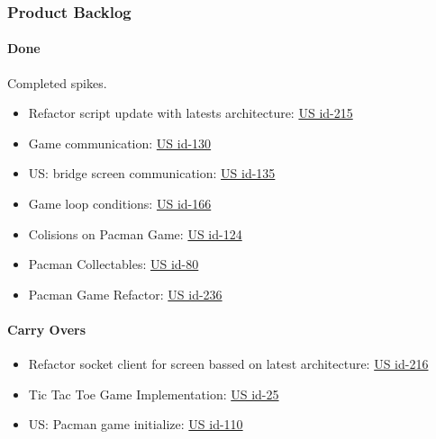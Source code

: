 \newpage

\subsubsection{Product Backlog}

\paragraph{Done}
Completed spikes.

\begin{itemize}
    \item Refactor script update with latests architecture: \href{https://tree.taiga.io/project/joseluis-teran-coffeetime/us/215?milestone=396824}{US id-215}
    \item Game communication: \href{https://tree.taiga.io/project/joseluis-teran-coffeetime/us/130?milestone=396824}{US id-130}
    \item US: bridge screen communication: \href{https://tree.taiga.io/project/joseluis-teran-coffeetime/us/135?milestone=396824}{US id-135}
    \item Game loop conditions: \href{https://tree.taiga.io/project/joseluis-teran-coffeetime/us/166?milestone=396824}{US id-166}
    \item  Colisions on Pacman Game: \href{https://tree.taiga.io/project/joseluis-teran-coffeetime/us/124?milestone=396824}{US id-124}
    \item  Pacman Collectables: \href{https://tree.taiga.io/project/joseluis-teran-coffeetime/us/80?milestone=396824}{US id-80}
    \item  Pacman Game Refactor: \href{https://tree.taiga.io/project/joseluis-teran-coffeetime/us/236?milestone=396824}{US id-236}
\end{itemize}

\paragraph{Carry Overs}
\begin{itemize}
    \item Refactor socket client for screen bassed on latest architecture: \href{https://tree.taiga.io/project/joseluis-teran-coffeetime/us/216?milestone=397461}{US id-216}
    \item Tic Tac Toe Game Implementation: \href{https://tree.taiga.io/project/joseluis-teran-coffeetime/us/25?milestone=397461}{US id-25}
    \item US: Pacman game initialize: \href{https://tree.taiga.io/project/joseluis-teran-coffeetime/us/110?milestone=397461}{US id-110}
\end{itemize}

